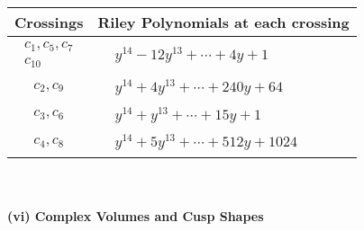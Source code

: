 \documentclass[1p]{elsarticle_modified}
\theoremstyle{definition}
\begin{document}
\begin{tabular}{m{50pt}|m{274pt}}
Crossings & \hspace{64pt}Riley Polynomials at each crossing \\
\hline $$\begin{aligned}c_{1},c_{5},c_{7}\\c_{10}\end{aligned}$$&$\begin{aligned}
&y^{14}-12 y^{13}+\cdots+4 y+1
\end{aligned}$\\
\hline $$\begin{aligned}c_{2},c_{9}\end{aligned}$$&$\begin{aligned}
&y^{14}+4 y^{13}+\cdots+240 y+64
\end{aligned}$\\
\hline $$\begin{aligned}c_{3},c_{6}\end{aligned}$$&$\begin{aligned}
&y^{14}+y^{13}+\cdots+15 y+1
\end{aligned}$\\
\hline $$\begin{aligned}c_{4},c_{8}\end{aligned}$$&$\begin{aligned}
&y^{14}+5 y^{13}+\cdots+512 y+1024
\end{aligned}$\\
\hline
\end{tabular}\\~\\
\newpage\flushleft \textbf{(vi) Complex Volumes and Cusp Shapes}
\end{document}
